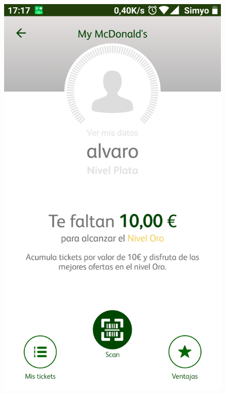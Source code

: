 \documentclass[twoside]{report}
\begin{document}
\begin{figure}[H]
\begin{center}
\includegraphics[scale=0.10]{images/restaurantes/mcdo1.png}

\end{center}
\end{figure}
\end{document}
